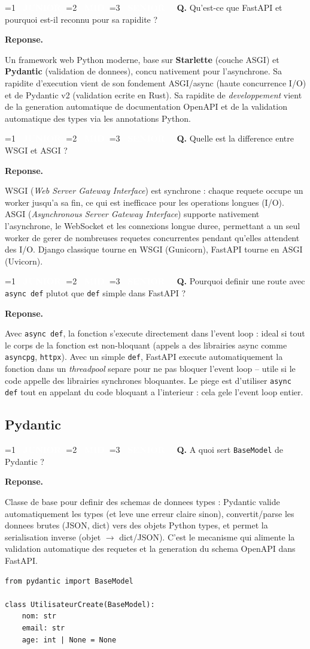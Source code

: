 \documentclass[11pt,a4paper]{article}
\newcommand{\badgeJ}{\textcolor{white}{\colorbox{junior}{\small\bfseries\ JUNIOR\ }}}
\newcommand{\badgeM}{\textcolor{white}{\colorbox{mid}{\small\bfseries\ MID\ }}}
\newcommand{\badgeS}{\textcolor{white}{\colorbox{senior}{\small\bfseries\ SENIOR\ }}}
\newcounter{qcount}
\newenvironment{qa}[2]{%
  \stepcounter{qcount}%
  \par\vspace{6pt}%
  \noindent\colorbox{qbg}{\parbox{\dimexpr\linewidth-12pt}{\vspace{2pt}%
  \ifnum#1=1 \badgeJ\fi\ifnum#1=2 \badgeM\fi\ifnum#1=3 \badgeS\fi
  \ \textbf{Q\theqcount.} #2\vspace{2pt}}}\par\vspace{4pt}%
  \noindent\textbf{\color{accent}Reponse.}\ \ignorespaces
}{%
  \par\vspace{8pt}%
}
\begin{document}
\begin{qa}{1}{Qu'est-ce que FastAPI et pourquoi est-il reconnu pour sa rapidite ?}
Un framework web Python moderne, base sur \textbf{Starlette} (couche ASGI) et
\textbf{Pydantic} (validation de donnees), concu nativement pour l'asynchrone.
Sa rapidite d'execution vient de son fondement ASGI/async (haute concurrence
I/O) et de Pydantic v2 (validation ecrite en Rust). Sa rapidite de
\emph{developpement} vient de la generation automatique de documentation
OpenAPI et de la validation automatique des types via les annotations Python.
\end{qa}

\begin{qa}{1}{Quelle est la difference entre WSGI et ASGI ?}
WSGI (\emph{Web Server Gateway Interface}) est synchrone : chaque requete
occupe un worker jusqu'a sa fin, ce qui est inefficace pour les operations
longues (I/O). ASGI (\emph{Asynchronous Server Gateway Interface}) supporte
nativement l'asynchrone, le WebSocket et les connexions longue duree,
permettant a un seul worker de gerer de nombreuses requetes concurrentes
pendant qu'elles attendent des I/O. Django classique tourne en WSGI (Gunicorn),
FastAPI tourne en ASGI (Uvicorn).
\end{qa}

\begin{qa}{2}{Pourquoi definir une route avec \texttt{async def} plutot que \texttt{def} simple dans FastAPI ?}
Avec \texttt{async def}, la fonction s'execute directement dans l'event loop :
ideal si tout le corps de la fonction est non-bloquant (appels a des
librairies async comme \texttt{asyncpg}, \texttt{httpx}). Avec un simple
\texttt{def}, FastAPI execute automatiquement la fonction dans un
\emph{threadpool} separe pour ne pas bloquer l'event loop -- utile si le code
appelle des librairies synchrones bloquantes. Le piege est d'utiliser
\texttt{async def} tout en appelant du code bloquant a l'interieur : cela
gele l'event loop entier.
\end{qa}

\subsection{Pydantic}

\begin{qa}{1}{A quoi sert \texttt{BaseModel} de Pydantic ?}
Classe de base pour definir des schemas de donnees types : Pydantic valide
automatiquement les types (et leve une erreur claire sinon), convertit/parse
les donnees brutes (JSON, dict) vers des objets Python types, et permet la
serialisation inverse (objet $\rightarrow$ dict/JSON). C'est le mecanisme qui
alimente la validation automatique des requetes et la generation du schema
OpenAPI dans FastAPI.
\begin{lstlisting}
from pydantic import BaseModel

class UtilisateurCreate(BaseModel):
    nom: str
    email: str
    age: int | None = None
\end{lstlisting}
\end{qa}
\end{document}
